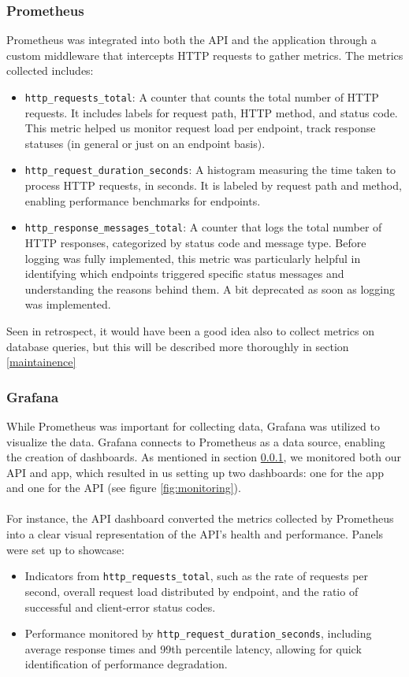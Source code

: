 \subsubsection{Prometheus}\label{prom}
Prometheus was integrated into both the API and the application through a custom middleware that intercepts HTTP requests to gather metrics. The metrics collected includes:

\begin{itemize}
\item \texttt{http\_requests\_total}: A counter that counts the total number of HTTP requests. It includes labels for request path, HTTP method, and status code. This metric helped us monitor request load per endpoint, track response statuses (in general or just on an endpoint basis).
\item \texttt{http\_request\_duration\_seconds}: A histogram measuring the time taken to process HTTP requests, in seconds. It is labeled by request path and method, enabling performance benchmarks for endpoints.
\item \texttt{http\_response\_messages\_total}: A counter that logs the total number of HTTP responses, categorized by status code and message type. Before logging was fully implemented, this metric was particularly helpful in identifying which endpoints triggered specific status messages and understanding the reasons behind them. A bit deprecated as soon as logging was implemented.
\end{itemize}
Seen in retrospect, it would have been a good idea also to collect metrics on database queries, but this will be described more thoroughly in section \ref{maintainence}

\subsubsection{Grafana}
While Prometheus was important for collecting data, Grafana was utilized to visualize the data. Grafana connects to Prometheus as a data source, enabling the creation of dashboards. As mentioned in section \ref{prom}, we monitored both our API and app, which resulted in us setting up two dashboards: one for the app and one for the API (see figure \ref{fig:monitoring}).
\\\\
For instance, the API dashboard converted the metrics collected by Prometheus into a clear visual representation of the API's health and performance. Panels were set up to showcase:
\begin{itemize}
    \item Indicators from \texttt{http\_requests\_total}, such as the rate of requests per second, overall request load distributed by endpoint, and the ratio of successful and client-error status codes.
    \item Performance monitored by \texttt{http\_request\_duration\_seconds}, including average response times and 99th percentile latency, allowing for quick identification of performance degradation.
\end{itemize}

